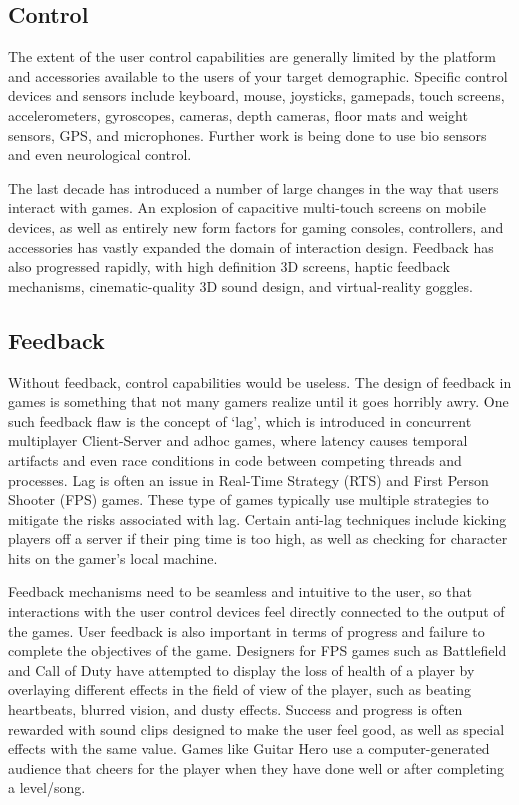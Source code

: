 \subsection{Control}

The extent of the user control capabilities are generally limited by the platform and accessories available to the users of your target demographic. Specific control devices and sensors include keyboard, mouse, joysticks, gamepads, touch screens, accelerometers, gyroscopes, cameras, depth cameras, floor mats and weight sensors, GPS, and microphones. Further work is being done to use bio sensors and even neurological control. 

The last decade has introduced a number of large changes in the way that users interact with games. An explosion of capacitive multi-touch screens on mobile devices, as well as entirely new form factors for gaming consoles, controllers, and accessories has vastly expanded the domain of interaction design. Feedback has also progressed rapidly, with high definition 3D screens, haptic feedback mechanisms, cinematic-quality 3D sound design, and virtual-reality goggles.

\subsection{Feedback}

Without feedback, control capabilities would be useless. The design of feedback in games is something that not many gamers realize until it goes horribly awry. One such feedback flaw is the concept of ‘lag’, which is introduced in concurrent multiplayer Client-Server and adhoc games, where latency causes temporal artifacts and even race conditions in code between competing threads and processes. Lag is often an issue in Real-Time Strategy (RTS) and First Person Shooter (FPS) games. These type of games typically use multiple strategies to mitigate the risks associated with lag. Certain anti-lag techniques include kicking players off a server if their ping time is too high, as well as checking for character hits on the gamer’s local machine.

Feedback mechanisms need to be seamless and intuitive to the user, so that interactions with the user control devices feel directly connected to the output of the games. User feedback is also important in terms of progress and failure to complete the objectives of the game. Designers for FPS games such as Battlefield and Call of Duty have attempted to display the loss of health of a player by overlaying different effects in the field of view of the player, such as beating heartbeats, blurred vision, and dusty effects. Success and progress is often rewarded with sound clips designed to make the user feel good, as well as special effects with the same value. Games like Guitar Hero use a computer-generated audience that cheers for the player when they have done well or after completing a level/song.

